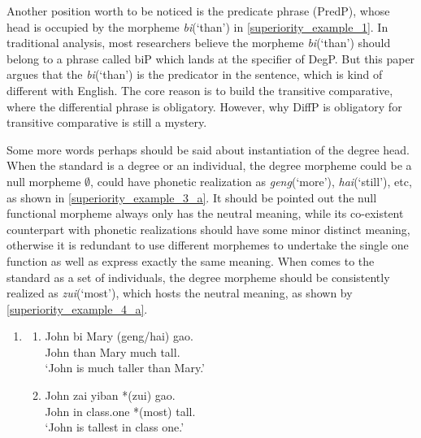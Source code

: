 \documentclass{ctexart}
\begin{document}
Another position worth to be noticed is the predicate phrase (PredP), whose head is occupied by the morpheme \textit{bi}(`than') in \ref{superiority_example_1}. In traditional analysis, most researchers believe the morpheme \textit{bi}(`than') should belong to a phrase called biP which lands at the specifier of DegP. But this paper argues that the \textit{bi}(`than') is the predicator in the sentence, which is kind of different with English. The core reason is to build the transitive comparative, where the differential phrase is obligatory. However, why DiffP is obligatory for transitive comparative is still a mystery. 

Some more words perhaps should be said about instantiation of the degree head. When the standard is a degree or an individual, the degree morpheme could be a null morpheme $\emptyset$, could have phonetic realization as \textit{geng}(`more'), \textit{hai}(`still'), etc, as shown in \ref{superiority_example_3_a}. It should be pointed out the null functional morpheme  always only has the neutral meaning, while its co-existent counterpart with phonetic realizations should have some minor distinct meaning, otherwise it is redundant to use  different morphemes to undertake the single one function as well as express exactly the same meaning. When comes to the standard as a set of individuals, the degree morpheme should be consistently realized as \textit{zui}(`most'), which hosts the neutral meaning, as shown by \ref{superiority_example_4_a}.

\begin{enumerate}
    \item \label{superiority_example_3}
    \begin{enumerate}
        \item \label{superiority_example_3_a}
        John \enspace bi \enspace Mary (geng/hai) gao. \\
        John than Mary \enspace \enspace much \enspace \enspace tall. \\
        `John is much taller than Mary.'

        \item \label{superiority_example_4_a}
        John zai \enspace yiban *(zui) \enspace gao. \\
        John in class.one *(most) tall. \\
        `John is tallest in class one.'


    \end{enumerate}
\end{enumerate}
\end{document}
